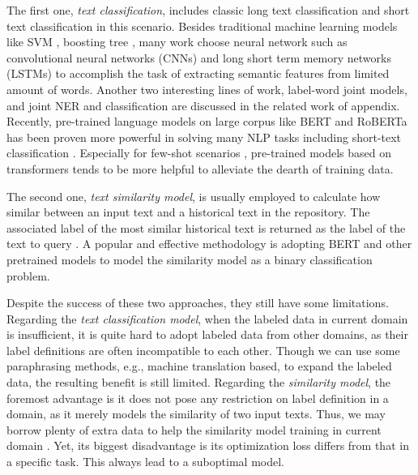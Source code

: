 The   first   one,   \emph{text  classification},  includes  classic  long  text
classification   and   short  text  classification  in  this  scenario.  Besides
traditional  machine  learning models like SVM \cite{suykens1999least}, boosting
tree  \cite{tu2005probabilistic},  many work \cite{wen2016network} choose neural
network      such      as      convolutional      neural     networks     (CNNs)
\cite{kim2014convolutional,zhang2015character,conneau2016very}  and  long  short
term  memory  networks  (LSTMs)  \cite{mousa2017contextual,liu2016recurrent}  to
accomplish  the  task  of  extracting  semantic  features from limited amount of
words.  Another two interesting lines of work, label-word
joint models, and joint NER and classification are discussed in the related work
of appendix.  Recently,  pre-trained  language  models  on  large  corpus  like BERT
\cite{devlin2018bert}  and  RoBERTa  \cite{liu2019roberta}  has been proven more
powerful   in   solving  many  NLP  tasks  including  short-text  classification
\cite{madabushi2020cost}.       Especially      for      few-shot      scenarios
\cite{yu2018diverse},     pre-trained     models     based    on    transformers
\cite{vaswani2017attention}  tends to be more helpful to alleviate the dearth of
training data.

The  second  one, \emph{text similarity model}, is usually employed to calculate
how  similar  between an input text and a historical text in the repository. The
associated label of the most similar historical text is returned as the label of
the  text  to  query \cite{jafarpour2010filter,   leuski2011npceditor}.  
A  popular  and  effective  methodology  is adopting BERT
\cite{devlin2018bert} and other pretrained models \cite{liu2019roberta} to model
the similarity model as a binary classification problem.

Despite  the  success  of  these two approaches, they still have some
limitations.  
Regarding  the  \emph{text  classification  model}, when the labeled data in current
domain  is  insufficient,  it  is  quite  hard  to adopt labeled data from other
domains, as their label definitions are often incompatible to each other. Though
we can use some paraphrasing methods, e.g., machine translation based, to expand
the labeled data, the resulting benefit is still limited.
Regarding the  \emph{similarity model}, the foremost advantage is it does not pose
any restriction on label definition in a domain, as it merely models the
similarity of two input texts. Thus, we may borrow plenty of extra data to help
the similarity model training in current domain \cite{sun2019fine}. 
Yet, its biggest disadvantage is its optimization loss differs from that in a
specific task. This always lead to a suboptimal model.  

